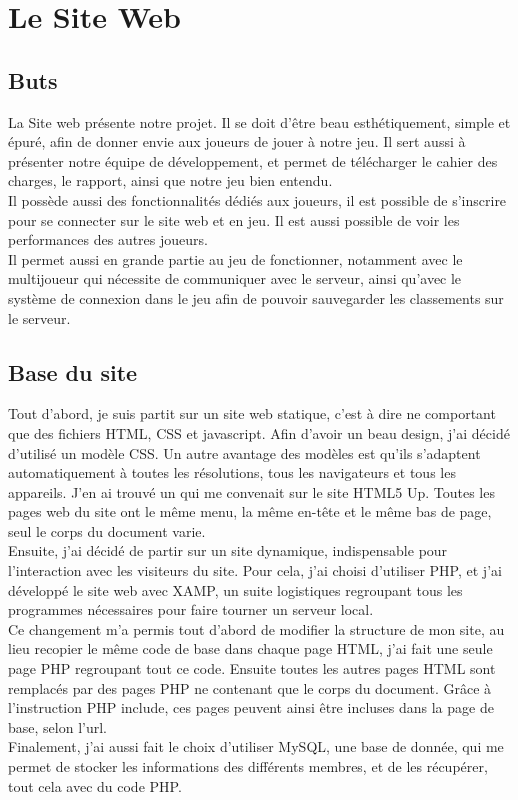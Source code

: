 \documentclass[12pt]{article}
\begin{document}
\section{Le Site Web}

\subsection{Buts}

La Site web présente notre projet. Il se doit d'être beau esthétiquement, simple et épuré, afin de donner envie aux joueurs de jouer à notre jeu. Il sert aussi à présenter notre équipe de développement, et permet de télécharger le cahier des charges, le rapport, ainsi que notre jeu bien entendu.\\
Il possède aussi des fonctionnalités dédiés aux joueurs, il est possible de s'inscrire pour se connecter sur le site web et en jeu. Il est aussi possible de voir les performances des autres joueurs.\\
Il permet aussi en grande partie au jeu de fonctionner, notamment avec le multijoueur qui nécessite de communiquer avec le serveur, ainsi qu'avec le système de connexion dans le jeu afin de pouvoir sauvegarder les classements sur le serveur.

\subsection{Base du site}

Tout d'abord, je suis partit sur un site web statique, c'est à dire ne comportant que des fichiers HTML, CSS et javascript. Afin d'avoir un beau design, j'ai décidé d'utilisé un modèle CSS. Un autre avantage des modèles est qu'ils s'adaptent automatiquement à toutes les résolutions, tous les navigateurs et tous les appareils. J'en ai trouvé un qui me convenait sur le site HTML5 Up. Toutes les pages web du site ont le même menu, la même en-tête et le même bas de page, seul le corps du document varie.\\

Ensuite, j'ai décidé de partir sur un site dynamique, indispensable pour l'interaction avec les visiteurs du site. Pour cela, j'ai choisi d'utiliser PHP, et j'ai développé le site web avec XAMP, un suite logistiques regroupant tous les programmes nécessaires pour faire tourner un serveur local.\\
Ce changement m'a permis tout d'abord de modifier la structure de mon site, au lieu recopier le même code de base dans chaque page HTML, j'ai fait une seule page PHP regroupant tout ce code. Ensuite toutes les autres pages HTML sont remplacés par des pages PHP ne contenant que le corps du document. Grâce à l'instruction PHP include, ces pages peuvent ainsi être incluses dans la page de base, selon l'url.\\
Finalement, j'ai aussi fait le choix d'utiliser MySQL, une base de donnée, qui me permet de stocker les informations des différents membres, et de les récupérer, tout cela avec du code PHP.
\end{document}
